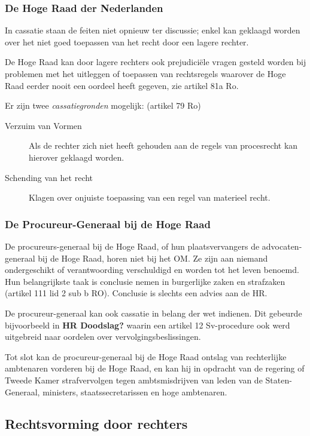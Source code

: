 \documentclass{article}
\begin{document}
\subsubsection{De Hoge Raad der Nederlanden}

In cassatie staan de feiten niet opnieuw ter discussie; enkel kan geklaagd
worden over het niet goed toepassen van het recht door een lagere rechter.

De Hoge Raad kan door lagere rechters ook prejudiciële vragen gesteld worden
bij problemen met het uitleggen of toepassen van rechtsregels waarover de Hoge
Raad eerder nooit een oordeel heeft gegeven, zie artikel 81a Ro.

Er zijn twee \emph{cassatiegronden} mogelijk: (artikel 79 Ro)

\begin{description}
  \item[Verzuim van Vormen] Als de rechter zich niet heeft gehouden aan de regels van
    procesrecht kan hierover geklaagd worden.
  \item[Schending van het recht] Klagen over onjuiste toepassing van een regel van
    materieel recht.
\end{description}

\subsubsection{De Procureur-Generaal bij de Hoge Raad}

De procureurs-generaal bij de Hoge Raad, of hun plaatsvervangers de
advocaten-generaal bij de Hoge Raad, horen niet bij het OM. Ze zijn aan niemand
ondergeschikt of verantwoording verschuldigd en worden tot het leven benoemd.
Hun belangrijkste taak is conclusie nemen in burgerlijke zaken en strafzaken
(artikel 111 lid 2 sub b RO). Conclusie is slechts een advies aan de HR.

De procureur-generaal kan ook cassatie in belang der wet indienen. Dit gebeurde
bijvoorbeeld in \textbf{HR Doodslag?} waarin een artikel 12 Sv-procedure ook
werd uitgebreid naar oordelen over vervolgingsbeslissingen.

Tot slot kan de procureur-generaal bij de Hoge Raad ontslag van rechterlijke
ambtenaren vorderen bij de Hoge Raad, en kan hij in opdracht van de regering of
Tweede Kamer strafvervolgen tegen ambtsmisdrijven van leden van de
Staten-Generaal, ministers, staatssecretarissen en hoge ambtenaren.

\subsection{Rechtsvorming door rechters}
\end{document}
